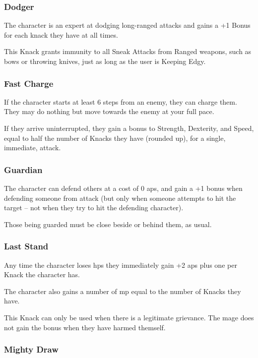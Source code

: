 \begin{multicols}{2}
\subsubsection{Dodger}
\label{dodger}

The character is an expert at dodging long-ranged attacks and gains a +1 Bonus for each knack they have at all times.

This Knack grants immunity to all Sneak Attacks from Ranged weapons, such as bows or throwing knives, just as long as the user is Keeping Edgy.

\subsubsection{Fast Charge}

If the character starts at least 6 steps from an enemy, they can charge them.
They may do nothing but move towards the enemy at your full pace.

If they arrive uninterrupted, they gain a bonus to Strength, Dexterity, and Speed, equal to half the number of Knacks they have (rounded up), for a single, immediate, attack.

\subsubsection{Guardian}

The character can defend others at a cost of 0 \glspl{ap}, and gain a +1 bonus when defending someone from attack (but only when someone attempts to hit the target -- not when they try to hit the defending character).

Those being guarded must be close beside or behind them, as usual.

\subsubsection{Last Stand}

Any time the character loses \glspl{hp} they immediately gain +2 \glspl{ap} plus one per Knack the character has.

The character also gains a number of \gls{mp} equal to the number of Knacks they have.

This Knack can only be used when there is a legitimate grievance.
The mage does not gain the bonus when they have harmed themself.

\subsubsection{Mighty Draw}


\end{multicols}
